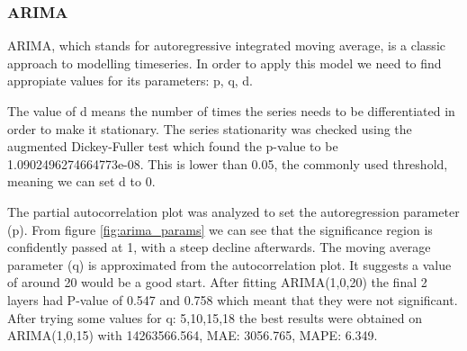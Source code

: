 \documentclass[12pt]{article}
\begin{document}
  \subsubsection{ARIMA}
  ARIMA\cite{arima}, which stands for autoregressive integrated moving average, is a classic approach 
  to modelling timeseries. In order to apply this model we need to find appropiate values for its 
  parameters: p, q, d. 
  
  The value of d means the number of times the series needs to be differentiated
  in order to make it stationary. The series stationarity was checked using the augmented Dickey-Fuller 
  test\cite{Dickey-Fuller} which found the p-value to be 1.0902496274664773e-08. This is lower than 0.05, 
  the commonly used threshold, meaning we can set d to 0. 
  
  The partial autocorrelation plot was analyzed
  to set the autoregression parameter (p). From figure \ref{fig:arima_params} we can see that the significance
  region is confidently passed at 1, with a steep decline afterwards. The moving average parameter (q) is 
  approximated from the autocorrelation plot. It suggests a value of around 20 would be a good start. 
  After fitting ARIMA(1,0,20) the final 2 layers had P-value of 0.547 and 0.758 which meant that they were 
  not significant. After trying some values for q: 5,10,15,18 the best results were obtained on ARIMA(1,0,15)
  with 14263566.564, MAE: 3056.765, MAPE: 6.349.
\end{document}
